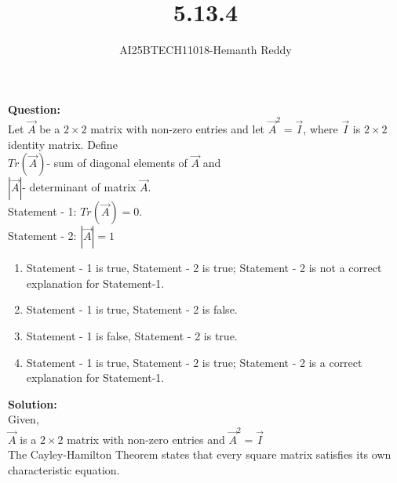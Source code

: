 \documentclass[journal]{IEEEtran}
\begin{document}

\vspace{3cm}

\title{5.13.4}
\author{AI25BTECH11018-Hemanth Reddy}
 \maketitle
{\let\newpage\relax\maketitle}

\renewcommand{\thefigure}{\theenumi}
\renewcommand{\thetable}{\theenumi}
\setlength{\intextsep}{10pt} %


\renewcommand{\thetable}{\theenumi}

\textbf{Question:}\\


    Let $\vec{A}$ be a $2\times2$ matrix with non-zero entries and let $\vec{A}^2 = \vec{I}$, where $\vec{I}$ is $2\times2$ identity matrix. Define \\
    $Tr(\vec{A})$- sum of diagonal elements of $\vec{A}$ and\\
    $|\vec{A}|$- determinant of matrix $\vec{A}$.\\
    Statement - 1: $Tr(\vec{A}) = 0$.\\
    Statement - 2: $|\vec{A}| = 1$\\


\begin{enumerate}
    \item Statement - 1 is true, Statement - 2 is true; Statement - 2 is not a correct explanation for Statement-1.
    \item Statement - 1 is true, Statement - 2 is false.
   \item Statement - 1 is false, Statement - 2 is true.

 \item Statement - 1 is true, Statement - 2 is true; Statement - 2 is a correct explanation for Statement-1.

\end{enumerate}

\textbf{Solution:}\\
Given,\\
$\vec{A}$ is a $2\times2$ matrix with non-zero entries and $\vec{A}^2 = \vec{I}$\\
The Cayley-Hamilton Theorem states that every square matrix satisfies its own characteristic equation.\\
\end{document}
